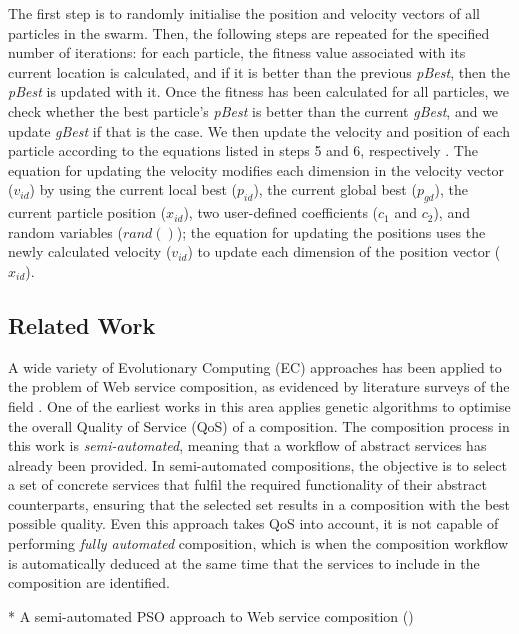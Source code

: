 \documentclass{llncs}
\begin{document}
The first step is to randomly initialise the position and velocity vectors of all particles in the swarm. Then, the following steps are repeated for the specified number of iterations: for each particle, the fitness value associated with its current location is calculated, and if it is better than the previous \textit{pBest}, then the \textit{pBest} is updated with it. Once the fitness has been calculated for all particles, we check whether the best particle's \textit{pBest} is better than the current \textit{gBest}, and we update \textit{gBest} if that is the case. We then update the velocity and position of each particle according to the equations listed in steps 5 and 6, respectively \cite{eberhart2001particle}. The equation for updating the velocity modifies each dimension in the velocity vector ($v_{id}$) by using the current local best ($p_{id}$), the current global best ($p_{gd}$), the current particle position ($x_{id}$), two user-defined coefficients ($c_1$ and $c_2$), and random variables ($rand()$); the equation for updating the positions uses the newly calculated velocity ($v_{id}$) to update each dimension of the position vector ($x_{id}$).

\subsection{Related Work}

A wide variety of Evolutionary Computing (EC) approaches has been applied to the problem of Web service composition, as evidenced by literature surveys of the field \cite{wang2012survey,pejman2012web}. One of the earliest works in this area \cite{canfora2005approach} applies genetic algorithms to optimise the overall Quality of Service (QoS) of a composition. The composition process in this work is \textit{semi-automated}, meaning that a workflow of abstract services has already been provided. In semi-automated compositions, the objective is to select a set of concrete services that fulfil the required functionality of their abstract counterparts, ensuring that the selected set results in a composition with the best possible quality. Even this approach takes QoS into account, it is not capable of performing \textit{fully automated} composition, which is when the composition workflow is automatically deduced at the same time that the services to include in the composition are identified.

* A semi-automated PSO approach to Web service composition (\cite{zhao2012improved})
\end{document}

